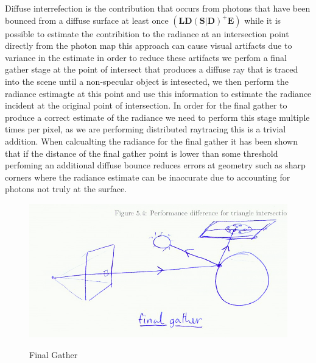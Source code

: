 Diffuse interrefection is the contribution that occurs from photons that have been bounced from a diffuse surface at least once
$(\mathbf{LD(S|D)^+E})$ while it is possible to estimate the contribition to the radiance at an intersection point directly from the photon map this
approach can cause visual artifacts due to variance in the estimate in order to reduce these artifacts we perfom a final gather
stage at the point of intersect that produces a diffuse ray that is traced into the scene until a non-specular object is intesected,
we then perform the radiance estimagte at this point and use this information to estimate the radiance incident at the original point of intersection.
In order for the final gather to produce a correct estimate of the radiance we need to perform this stage multiple times per pixel, as we
are performing distributed raytracing this is a trivial addition. When calcualting the radiance for the final gather it has been shown 
that if the distance of the final gather point is lower than some threshold perfoming an additional diffuse bounce reduces errors at geometry
such as sharp corners where the radiance estimate can be inaccurate due to accounting for photons not truly at the surface.

\begin{figure}
\centering
\includegraphics[width=\textwidth]{./images/final_gather.png}
\label{fig:final_gather}
\caption{Final Gather}
\end{figure}

